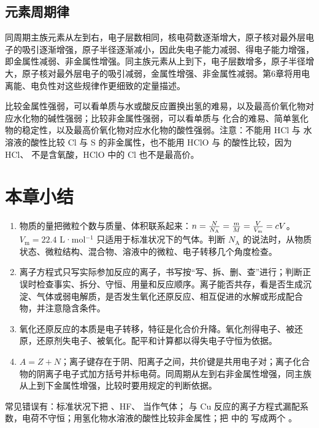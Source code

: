 \documentclass[UTF8,a4paper,zihao=5,oneside,openany,fontset=none]{ctexbook}
\newcommand{\zhangmo}[1]{\par\Needspace{6\baselineskip}\section*{#1}\addcontentsline{toc}{section}{#1}}
\begin{document}
\subsection{元素周期律}
同周期主族元素从左到右，电子层数相同，核电荷数逐渐增大，原子核对最外层电子的吸引逐渐增强，原子半径逐渐减小，因此失电子能力减弱、得电子能力增强，即金属性减弱、非金属性增强。同主族元素从上到下，电子层数增多，原子半径增大，原子核对最外层电子的吸引减弱，金属性增强、非金属性减弱。第6章将用电离能、电负性对这些规律作更细致的定量描述。

比较金属性强弱，可以看单质与水或酸反应置换出氢的难易，以及最高价氧化物对应水化物的碱性强弱；比较非金属性强弱，可以看单质与  化合的难易、简单氢化物的稳定性，以及最高价氧化物对应水化物的酸性强弱。注意：不能用 HCl 与  水溶液的酸性比较 Cl 与 S 的非金属性，也不能用 HClO 与  的酸性比较，因为 HCl、 不是含氧酸，HClO 中的 Cl 也不是最高价。



\zhangmo{本章小结}
\begin{enumerate}
\item 物质的量把微粒个数与质量、体积联系起来：$n=\frac N{N_\text A}=\frac mM=\frac V{V_\text m}=cV$。$V_\text{m}=22.4$ L·mol$^{-1}$ 只适用于标准状况下的气体。判断 $N_\text{A}$ 的说法时，从物质状态、微粒结构、混合物、溶液中的微粒、电子转移几个角度检查。
\item 离子方程式只写实际参加反应的离子，书写按“写、拆、删、查”进行；判断正误时检查事实、拆分、守恒、用量和反应顺序。离子能否共存，看是否生成沉淀、气体或弱电解质，是否发生氧化还原反应、相互促进的水解或形成配合物，并注意隐含条件。
\item 氧化还原反应的本质是电子转移，特征是化合价升降。氧化剂得电子、被还原，还原剂失电子、被氧化。配平和计算都以得失电子守恒为依据。
\item $A=Z+N$；离子键存在于阴、阳离子之间，共价键是共用电子对；离子化合物的阴离子电子式加方括号并标电荷。同周期从左到右非金属性增强，同主族从上到下金属性增强，比较时要用规定的判断依据。
\end{enumerate}
常见错误有：标准状况下把 、HF、 当作气体； 与 Cu 反应的离子方程式漏配系数，电荷不守恒；用氢化物水溶液的酸性比较非金属性；把  中的  写成两个 。
\end{document}
